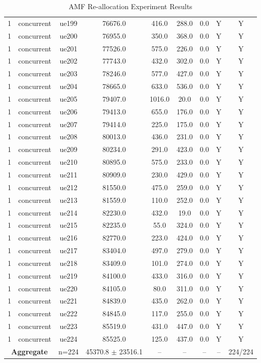 \begin{table}[ht]
\begin{tabular}{|c|c|c|c|c|c|c|c|c|}
1 & concurrent & ue199 & 76676.0 & 416.0 & 288.0 & 0.0 & Y & Y \\
1 & concurrent & ue200 & 76955.0 & 350.0 & 368.0 & 0.0 & Y & Y \\
1 & concurrent & ue201 & 77526.0 & 575.0 & 226.0 & 0.0 & Y & Y \\
1 & concurrent & ue202 & 77743.0 & 432.0 & 302.0 & 0.0 & Y & Y \\
1 & concurrent & ue203 & 78246.0 & 577.0 & 427.0 & 0.0 & Y & Y \\
1 & concurrent & ue204 & 78665.0 & 633.0 & 536.0 & 0.0 & Y & Y \\
1 & concurrent & ue205 & 79407.0 & 1016.0 & 20.0 & 0.0 & Y & Y \\
1 & concurrent & ue206 & 79413.0 & 655.0 & 176.0 & 0.0 & Y & Y \\
1 & concurrent & ue207 & 79414.0 & 225.0 & 175.0 & 0.0 & Y & Y \\
1 & concurrent & ue208 & 80013.0 & 436.0 & 231.0 & 0.0 & Y & Y \\
1 & concurrent & ue209 & 80234.0 & 291.0 & 423.0 & 0.0 & Y & Y \\
1 & concurrent & ue210 & 80895.0 & 575.0 & 233.0 & 0.0 & Y & Y \\
1 & concurrent & ue211 & 80909.0 & 230.0 & 429.0 & 0.0 & Y & Y \\
1 & concurrent & ue212 & 81550.0 & 475.0 & 259.0 & 0.0 & Y & Y \\
1 & concurrent & ue213 & 81559.0 & 110.0 & 252.0 & 0.0 & Y & Y \\
1 & concurrent & ue214 & 82230.0 & 432.0 & 19.0 & 0.0 & Y & Y \\
1 & concurrent & ue215 & 82235.0 & 55.0 & 324.0 & 0.0 & Y & Y \\
1 & concurrent & ue216 & 82770.0 & 223.0 & 424.0 & 0.0 & Y & Y \\
1 & concurrent & ue217 & 83404.0 & 497.0 & 279.0 & 0.0 & Y & Y \\
1 & concurrent & ue218 & 83409.0 & 101.0 & 274.0 & 0.0 & Y & Y \\
1 & concurrent & ue219 & 84100.0 & 433.0 & 316.0 & 0.0 & Y & Y \\
1 & concurrent & ue220 & 84105.0 & 80.0 & 311.0 & 0.0 & Y & Y \\
1 & concurrent & ue221 & 84839.0 & 435.0 & 262.0 & 0.0 & Y & Y \\
1 & concurrent & ue222 & 84845.0 & 117.0 & 255.0 & 0.0 & Y & Y \\
1 & concurrent & ue223 & 85519.0 & 431.0 & 447.0 & 0.0 & Y & Y \\
1 & concurrent & ue224 & 85525.0 & 125.0 & 437.0 & 0.0 & Y & Y \\
\multicolumn{2}{|c|}{\textbf{Aggregate}} & n=224 & 45370.8 $\pm$ 23516.1 & -- & -- & -- & -- & 224/224 \\
\hline
\end{tabular}
\caption{AMF Re-allocation Experiment Results}
\label{tab:amf_realloc}
\end{table}
